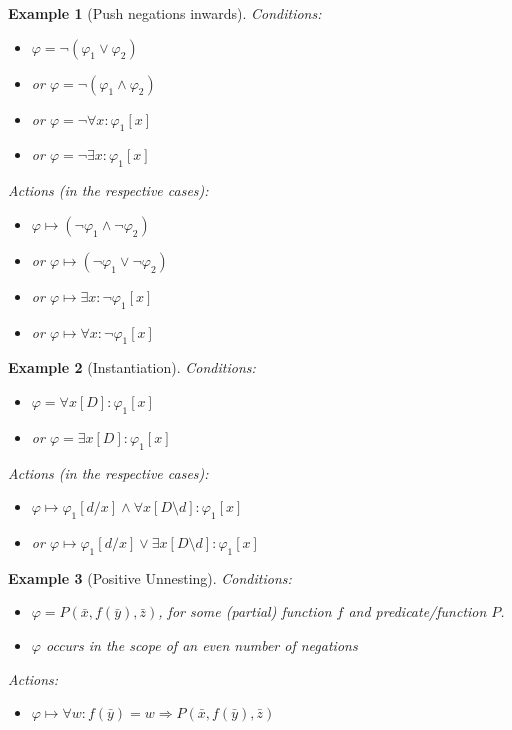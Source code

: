\documentclass{article}
\newtheorem{example}{Example}
\begin{document}
\begin{example}[Push negations inwards]
Conditions:
\begin{itemize}
	\item $\varphi = \lnot\left( \varphi_1 \lor \varphi_2\right)$
    \item or $\varphi = \lnot\left( \varphi_1 \land \varphi_2\right)$    
    \item or $\varphi = \lnot\forall x: \varphi_1[x]$    
    \item or $\varphi = \lnot\exists x: \varphi_1[x]$
\end{itemize}
Actions (in the respective cases):
\begin{itemize}
	\item $\varphi \mapsto\left(  \lnot \varphi_1 \land  \lnot \varphi_2\right)$
    \item or $\varphi \mapsto \left( \lnot \varphi_1 \lor \lnot \varphi_2\right)$
    \item or $\varphi \mapsto \exists x: \lnot\varphi_1[x]$
    \item or $\varphi \mapsto \forall x: \lnot\varphi_1[x]$ 
\end{itemize}
\end{example}

\begin{example}[Instantiation]
Conditions:
\begin{itemize}
    \item  $\varphi = \forall x[D]: \varphi_1[x]$
    \item or $\varphi = \exists x[D]: \varphi_1[x]$
\end{itemize}
Actions (in the respective cases):
\begin{itemize}
    \item  $\varphi \mapsto \varphi_1[d/x] \land  \forall x[D\setminus d]: \varphi_1[x]$
    \item or $\varphi \mapsto \varphi_1[d/x] \lor  \exists x[D\setminus d]: \varphi_1[x]$
\end{itemize}
\end{example}

\begin{example}[Positive Unnesting]
Conditions:
\begin{itemize}
    \item  $\varphi = P(\bar x, f(\bar y),\bar z)$, for some (partial) function $f$ and predicate/function $P$.
	\item $\varphi$ occurs in the scope of an even number of negations
\end{itemize}
Actions:
\begin{itemize}
    \item  $\varphi \mapsto \forall w: f(\bar y) = w \Rightarrow P(\bar x, f(\bar y),\bar z)$
\end{itemize}
\end{example}
\end{document}
